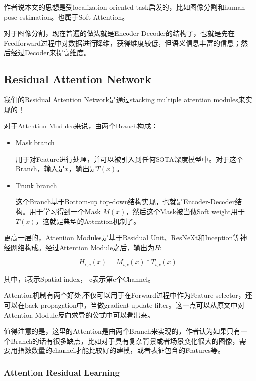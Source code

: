 作者说本文的思想是受localization oriented task启发的，比如图像分割和human pose estimation。也属于Soft Attention。

对于图像分割，现在普遍的做法就是Encoder-Decoder的结构了，也就是先在Feedforward过程中对数据进行降维，获得维度较低，但语义信息丰富的信息；然后经过Decoder来提高维度。

\subsection{Residual Attention Network}

我们的Residual Attention Network是通过stacking multiple attention modules来实现的！

对于Attention Modules来说，由两个Branch构成：
\begin{itemize}
\item Mask branch

用于对Feature进行处理，并可以被引入到任何SOTA深度模型中。对于这个Branch，输入是$x$，输出是$T(x)$。

\item Trunk branch

这个Branch基于Bottom-up top-down结构实现，也就是Encoder-Decoder结构。用于学习得到一个Mask $M(x)$，然后这个Mask被当做Soft weight用于$T(x)$，这就是典型的Attention机制了。

\end{itemize}

更高一层的，Attention Modules是基于Residual Unit、ResNeXt和Inception等神经网络构成。经过Attention Module之后，输出为$H$:

\begin{displaymath}
H_{i, c}(x) = M_{i, c}(x) * T_{i, c}(x)
\end{displaymath}

其中，i表示Spatial index， c表示第c个Channel。

Attention机制有两个好处,不仅可以用于在Forward过程中作为Feature selector，还可以在back propagation中，当做gradient update filter。这一点可以从原文中对Attention Module反向求导的公式中可以看出来。

值得注意的是，这里的Attention是由两个Branch来实现的，作者认为如果只有一个Branch的话有很多缺点，比如对于具有复杂背景或者场景变化很大的图像，需要用指数数量的channel才能比较好的建模，或者表征包含的Features等。

\subsubsection{Attention Residual Learning}

